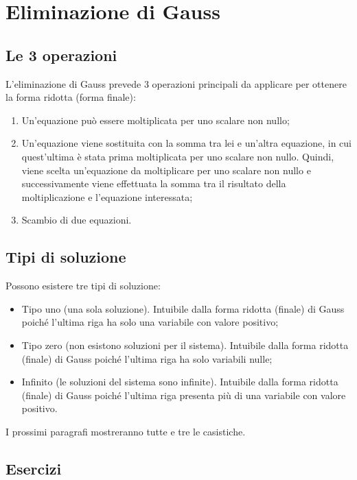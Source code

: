 \documentclass[a4paper]{article}
\begin{document}
	\section{Eliminazione di Gauss}
	
	\subsection{Le 3 operazioni}
	
	L'eliminazione di Gauss prevede 3 operazioni principali da applicare per ottenere la forma ridotta (forma finale):
	\begin{enumerate}
		\item Un'equazione può essere moltiplicata per uno scalare non nullo;
		
		\item Un'equazione viene sostituita con la somma tra lei e un'altra equazione, in cui quest'ultima è stata prima moltiplicata per uno scalare non nullo. Quindi, viene scelta un'equazione da moltiplicare per uno scalare non nullo e successivamente viene effettuata la somma tra il risultato della moltiplicazione e l'equazione interessata;
		
		\item Scambio di due equazioni.
	\end{enumerate}

	\subsection{Tipi di soluzione}
	
	Possono esistere tre tipi di soluzione:
	\begin{itemize}
		\item Tipo uno (una sola soluzione). Intuibile dalla forma ridotta (finale) di Gauss poiché l'ultima riga ha solo una variabile con valore positivo;
		
		\item Tipo zero (non esistono soluzioni per il sistema). Intuibile dalla forma ridotta (finale) di Gauss poiché l'ultima riga ha solo variabili nulle;
		
		\item Infinito (le soluzioni del sistema sono infinite). Intuibile dalla forma ridotta (finale) di Gauss poiché l'ultima riga presenta più di una variabile con valore positivo.
	\end{itemize}
	I prossimi paragrafi mostreranno tutte e tre le casistiche.\newpage

	\subsection{Esercizi}
	
\end{document}

